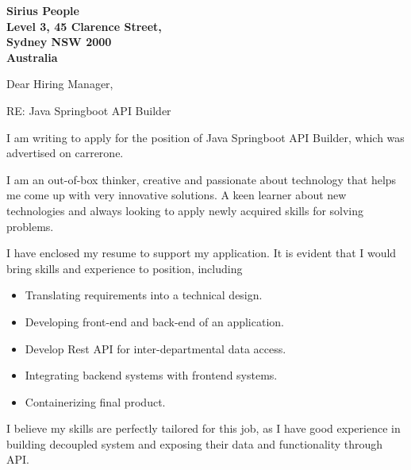 \documentclass{letter}
\begin{document}
\begin{letter}{\bf Sirius People \\Level 3, 45 Clarence Street, \\Sydney NSW 2000 \\ Australia}

\opening{Dear Hiring Manager,\\}

RE: Java Springboot API Builder


I am writing to apply for the position of Java Springboot API Builder, which was advertised on carrerone.


I am an out-of-box thinker, creative and passionate about technology that helps me come up with very innovative solutions. A keen learner about new technologies and always looking to apply newly acquired skills for solving problems.

I have enclosed my resume to support my application. It is evident that I would bring skills and experience to position, including\\
\begin{itemize}
\item Translating requirements into a technical design.
\item Developing front-end and back-end of an application.
\item Develop Rest API for inter-departmental data access.
\item Integrating backend systems with frontend systems.
\item Containerizing final product.
\end{itemize}

I believe my skills are perfectly tailored for this job, as I have good experience in building decoupled system and exposing their data and functionality through API.




\end{letter}
\end{document}
